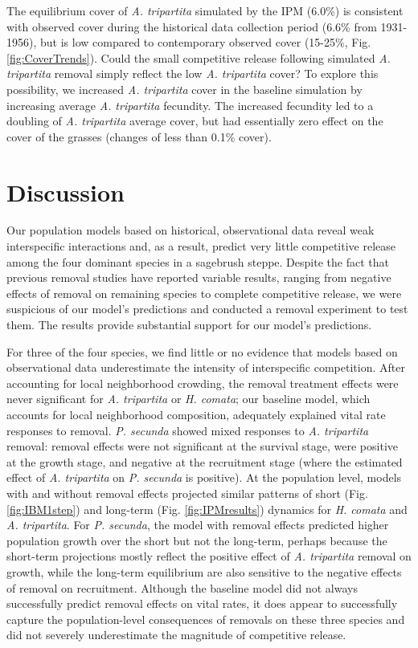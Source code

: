 \documentclass[11pt]{article}
\begin{document}
\begin{doublespacing}
 The equilibrium cover of \textit{A. tripartita} simulated by the IPM (6.0\%) is consistent with observed cover during the historical data collection period (6.6\% from 1931-1956), but is low compared to contemporary observed cover (15-25\%, Fig. \ref{fig:CoverTrends}). Could the small competitive release following simulated \textit{A. tripartita} removal simply reflect the low \textit{A. tripartita} cover? To explore this possibility, we increased \textit{A. tripartita} cover in the baseline simulation by increasing average \textit{A. tripartita} fecundity. The increased fecundity led to a doubling of \textit{A. tripartita} average cover, but had essentially zero effect on the cover of the grasses (changes of less than 0.1\% cover). 

\section*{Discussion}

Our population models based on historical, observational data reveal weak interspecific interactions \citep{adler_coexistence_2010,chu_large_2015} and, as a result, predict very little competitive release among the four dominant species in a sagebrush steppe. Despite the fact that previous removal studies have reported variable results, ranging from negative effects of removal on remaining species to complete competitive release, we were suspicious of our model's predictions and conducted a removal experiment to test them. The results provide substantial support for our model's predictions.

For three of the four species, we find little or no evidence that models based on observational data underestimate the intensity of interspecific competition. After accounting for local neighborhood crowding, the removal treatment effects were never significant for \textit{A. tripartita} or \textit{H. comata}; our baseline model, which accounts for local neighborhood composition, adequately explained vital rate responses to  removal.  \textit{P. secunda} showed mixed responses to \textit{A. tripartita} removal: removal effects were not significant at the survival stage, were positive at the growth stage, and negative at the recruitment stage (where the estimated effect of \textit{A. tripartita} on \textit{P. secunda} is positive). At the population level, models with and without removal effects projected similar patterns of short (Fig. \ref{fig:IBM1step}) and long-term (Fig. \ref{fig:IPMresults}) dynamics for \textit{H. comata} and \textit{A. tripartita}. For \textit{P. secunda}, the model with removal effects predicted higher population growth over the short but not the long-term, perhaps because the short-term projections mostly reflect the positive effect of \textit{A. tripartita} removal on growth, while the long-term equilibrium are also sensitive to the negative effects of removal on recruitment. Although the baseline model did not always successfully predict removal effects on vital rates, it does appear to successfully capture the population-level consequences of removals on these three species and did not severely underestimate the magnitude of competitive release.


\end{doublespacing}
\end{document}
